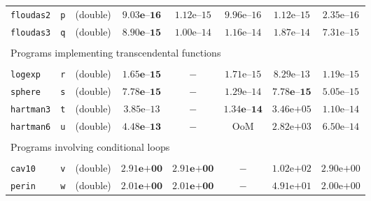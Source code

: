 \begin{tabular}{p{2.3cm}ccccccc}
\multirow{1}{*}{\texttt{floudas2}} & \texttt{p}
& (double) &  $\mathbf{9.03\textbf{e--}16}$ & $1.12\text{e--}15$ & $9.96\text{e--}16$ & $1.12\text{e--}15$ & $2.35\text{e--}16$ \\
\multirow{1}{*}{\texttt{floudas3}} & \texttt{q}
& (double) & $\mathbf{8.90\textbf{e--}15}$ & $1.00\text{e--}14$ & $1.16\text{e--}14$ & $1.87\text{e--}14$ & $7.31\text{e--}15$ \\
\hline
\\
\multicolumn{8}{l}{Programs implementing transcendental functions}\\
\\
\hline
\multirow{1}{*}{\texttt{logexp}} & \texttt{r}
& (double) & $\mathbf{1.65\textbf{e--}15}$ & $-$ & $1.71\text{e--}15$ & $8.29\text{e--}13$ & $1.19\text{e--}15$ \\
\multirow{1}{*}{\texttt{sphere}} & \texttt{s}
& (double) & $\mathbf{7.78\textbf{e--}15}$ & $-$ & $1.29\text{e--}14$ & $\mathbf{7.78\textbf{e--}15}$ & $5.05\text{e--}15$ \\
\multirow{1}{*}{\texttt{hartman3}} & \texttt{t}
& (double) & $3.85\text{e--}13$ & $-$  & $\mathbf{1.34\textbf{e--}14}$ & $3.46\text{e+}05$ & $1.10\text{e--}14$ \\
\multirow{1}{*}{\texttt{hartman6}} & \texttt{u}
& (double) & $\mathbf{4.48\textbf{e--}13}$ & $-$ & $\text{OoM}$ & $2.82\text{e+}03$ & $6.50\text{e--}14$ \\
\hline
\\
\multicolumn{8}{l}{Programs involving conditional loops}    \\
\\
\hline
\multirow{1}{*}{\texttt{cav10}} & \texttt{v}
& (double) & $\mathbf{2.91\textbf{e+}00}$ & $\mathbf{2.91\textbf{e+}00}$ & $-$ & $1.02\text{e+}02$ & $2.90\text{e+}00$ \\
\multirow{1}{*}{\texttt{perin}} & \texttt{w}
& (double) & $\mathbf{2.01\textbf{e+}00}$ & $\mathbf{2.01\textbf{e+}00}$ & $-$ & $4.91\text{e+}01$ & $2.00\text{e+}00$ \\
\hline
\end{tabular}

